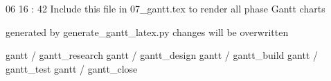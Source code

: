     06 16 : 42 %
        Include this file in 07_gantt.tex to render all phase Gantt charts

    generated by generate_gantt_latex.py %
    changes will be overwritten

 {
  gantt / gantt_research
}
 { gantt / gantt_design }
 { gantt / gantt_build }
 { gantt / gantt_test }
 { gantt / gantt_close }
